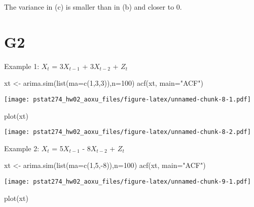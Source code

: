 \documentclass[
]{article}
\newenvironment{Shaded}{\begin{snugshade}}{\end{snugshade}}
\newcommand{\AttributeTok}[1]{\textcolor[rgb]{0.77,0.63,0.00}{#1}}
\newcommand{\DecValTok}[1]{\textcolor[rgb]{0.00,0.00,0.81}{#1}}
\newcommand{\FunctionTok}[1]{\textcolor[rgb]{0.00,0.00,0.00}{#1}}
\newcommand{\NormalTok}[1]{#1}
\newcommand{\OtherTok}[1]{\textcolor[rgb]{0.56,0.35,0.01}{#1}}
\newcommand{\SpecialCharTok}[1]{\textcolor[rgb]{0.00,0.00,0.00}{#1}}
\newcommand{\StringTok}[1]{\textcolor[rgb]{0.31,0.60,0.02}{#1}}
\begin{document}
The variance in (c) is smaller than in (b) and closer to 0.

\hypertarget{g2}{%
\section{G2}\label{g2}}

Example 1: \(X_t\) = 3\(X_{t-1}\) + 3\(X_{t-2}\) + \(Z_t\)

\begin{Shaded}
\begin{Highlighting}[]
\NormalTok{xt }\OtherTok{\textless{}{-}} \FunctionTok{arima.sim}\NormalTok{(}\FunctionTok{list}\NormalTok{(}\AttributeTok{ma=}\FunctionTok{c}\NormalTok{(}\DecValTok{1}\NormalTok{,}\DecValTok{3}\NormalTok{,}\DecValTok{3}\NormalTok{)),}\AttributeTok{n=}\DecValTok{100}\NormalTok{)}
\FunctionTok{acf}\NormalTok{(xt, }\AttributeTok{main=}\StringTok{"ACF"}\NormalTok{)}
\end{Highlighting}
\end{Shaded}

\texttt{[image: pstat274\_hw02\_aoxu\_files/figure-latex/unnamed-chunk-8-1.pdf]}

\begin{Shaded}
\begin{Highlighting}[]
\FunctionTok{plot}\NormalTok{(xt)}
\end{Highlighting}
\end{Shaded}

\texttt{[image: pstat274\_hw02\_aoxu\_files/figure-latex/unnamed-chunk-8-2.pdf]}

Example 2: \(X_t\) = 5\(X_{t-1}\) - 8\(X_{t-2}\) + \(Z_t\)

\begin{Shaded}
\begin{Highlighting}[]
\NormalTok{xt }\OtherTok{\textless{}{-}} \FunctionTok{arima.sim}\NormalTok{(}\FunctionTok{list}\NormalTok{(}\AttributeTok{ma=}\FunctionTok{c}\NormalTok{(}\DecValTok{1}\NormalTok{,}\DecValTok{5}\NormalTok{,}\SpecialCharTok{{-}}\DecValTok{8}\NormalTok{)),}\AttributeTok{n=}\DecValTok{100}\NormalTok{)}
\FunctionTok{acf}\NormalTok{(xt, }\AttributeTok{main=}\StringTok{"ACF"}\NormalTok{)}
\end{Highlighting}
\end{Shaded}

\texttt{[image: pstat274\_hw02\_aoxu\_files/figure-latex/unnamed-chunk-9-1.pdf]}

\begin{Shaded}
\begin{Highlighting}[]
\FunctionTok{plot}\NormalTok{(xt)}
\end{Highlighting}
\end{Shaded}
\end{document}

